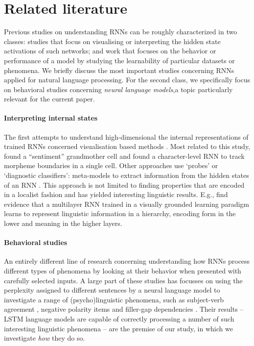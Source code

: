 
\section{Related literature}

Previous studies on understanding RNNs can be roughly characterized in two classes: studies that focus on visualising or interpreting the hidden state activations of such networks; and work that focuses on the behavior or performance of a model by studying the learnability of particular datasets or phenomena.
We briefly discuss the most important studies concerning RNNs applied for natural language processing.
For the second class, we specifically focus on behavioral studies concerning \textit{neural language models},a topic particularly relevant for the current paper.

\paragraph{Interpreting internal states}
The first attempts to understand high-dimensional the internal representations of trained RNNs concerned visualisation based methods \cite{Karpathy:etal:2016,tang2017memory,li2016visualizing,Radford:etal:2017}.
Most related to this study,  found a ``sentiment'' grandmother cell and  found a character-level RNN to track morpheme boundaries in a single cell.
Other approaches use `probes' or `diagnostic classifiers': meta-models to extract information from the hidden states of an RNN \cite{Adi:etal:2017,Hupkes:etal:2017,alain2017understanding}.
This approach is not limited to finding properties that are encoded in a localist fashion and has yielded interesting linguistic results.
E.g.,  find evidence that a multilayer RNN trained in a visually grounded learning paradigm learns to represent linguistic information in a hierarchy, encoding form in the lower and meaning in the higher layers.

\paragraph{Behavioral studies}
An entirely different line of research concerning understanding how RNNs process different types of phenomena by looking at their behavior when presented with carefully selected inputs.
A large part of these studies has focusses on using the perplexity assigned to different sentences by a neural language model to investigate a range of (psycho)linguistic phenomena, such as subject-verb agreement \cite{Linzen:etal:2016,Bernardy:Lappin:2017,Gulordava:etal:2018,Kuncoro:etal:2018a,Kuncoro:etal:2018b,Linzen:Leonard:2018}, negative polarity items \cite{marvin2018targeted,jumelet2018language} and filler-gap dependencies \cite{wilcox2018rnn}.
Their results -- LSTM language models are capable of correctly processing a number of such interesting linguistic phenomena -- are the premise of our study, in which we investigate \textit{how} they do so.

